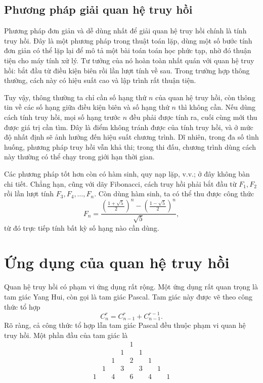\documentclass[11pt]{article}
\begin{document}
\subsection{Phương pháp giải quan hệ truy hồi}

Phương pháp đơn giản và dễ dùng nhất để giải quan hệ truy hồi chính là tính
truy hồi. Đây là một phương pháp trong thuật toán lặp, dùng một số bước tính
đơn giản có thể lặp lại để mô tả một bài toán toán học phức tạp, nhờ đó thuận
tiện cho máy tính xử lý. Tư tưởng của nó hoàn toàn nhất quán với quan hệ truy
hồi: bắt đầu từ điều kiện biên rồi lần lượt tính về sau. Trong trường hợp
thông thường, cách này có hiệu suất cao và lập trình rất thuận tiện.

Tuy vậy, thông thường ta chỉ cần số hạng thứ \(n\) của quan hệ truy hồi, còn
thông tin về các số hạng giữa điều kiện biên và số hạng thứ \(n\) thì không
cần. Nếu dùng cách tính truy hồi, mọi số hạng trước \(n\) đều phải được tính
ra, cuối cùng mới thu được giá trị cần tìm. Đây là điểm không tránh được của
tính truy hồi, và ở mức độ nhất định sẽ ảnh hưởng đến hiệu suất chương trình.
Dĩ nhiên, trong đa số tình huống, phương pháp truy hồi vẫn khả thi; trong thi
đấu, chương trình dùng cách này thường có thể chạy trong giới hạn thời gian.

Các phương pháp tốt hơn còn có hàm sinh, quy nạp lặp, v.v.; ở đây không bàn
chi tiết. Chẳng hạn, cũng với dãy Fibonacci, cách truy hồi phải bắt đầu từ
\(F_1,F_2\) rồi lần lượt tính \(F_3,F_4,\ldots,F_n\). Còn dùng hàm sinh, ta
có thể thu được công thức
\[
  F_n=
  \frac{
    \left(\frac{1+\sqrt5}{2}\right)^n
    -
    \left(\frac{1-\sqrt5}{2}\right)^n
  }{\sqrt5},
\]
từ đó trực tiếp tính bất kỳ số hạng nào cần dùng.

\section{Ứng dụng của quan hệ truy hồi}

Quan hệ truy hồi có phạm vi ứng dụng rất rộng. Một ứng dụng rất quan trọng là
tam giác Yang Hui, còn gọi là tam giác Pascal. Tam giác này được vẽ theo công
thức tổ hợp
\[
  C_n^r=C_{n-1}^r+C_{n-1}^{r-1}.
\]
Rõ ràng, cả công thức tổ hợp lẫn tam giác Pascal đều thuộc phạm vi quan hệ
truy hồi. Một phần đầu của tam giác là
\[
\begin{array}{ccccccccc}
&&&&1&&&&\\
&&&1&&1&&&\\
&&1&&2&&1&&\\
&1&&3&&3&&1&\\
1&&4&&6&&4&&1
\end{array}
\]
\end{document}
